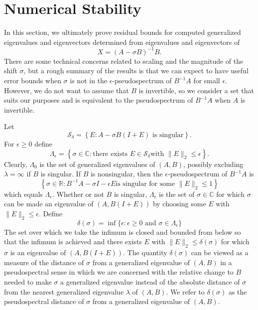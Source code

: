 \documentclass[12pt]{article}
\def\R{ {\mathbb R}}\def\C{ {\mathbb C}}\def\N{ {\mathbb N}}
\begin{document}
\section{Numerical Stability}
\label{sec:numerical-stability}

In this section, we ultimately prove residual bounds for computed
generalized eigenvalues and eigenvectors determined from eigenvalues
and eigenvectors of
\begin{equation}
  \label{eq:Xdef}
  X = (A-\sigma B)^{-1} B.
\end{equation}
There are some technical concerns related to scaling and the magnitude
of the shift $\sigma$, but a rough summary of the results is that we
can expect to have useful error bounds when $\sigma$ is not in the
$\epsilon$-pseudospectrum of $B^{-1}A$ for small $\epsilon$.  However,
we do not want to assume that $B$ is invertible, so we consider a set
that suits our purposes and is equivalent to the pseudospectrum of
$B^{-1}A$ when $A$ is invertible.

Let
\begin{equation}
  \label{eq:S_def}
  \mathcal{S}_\delta = 
  \left\{ E : \mbox{$A - \sigma B (I+E)$ is singular} \right\}.
\end{equation}
For $\epsilon \geq 0$ define
\begin{equation}
  \Lambda_\epsilon =
  \left\{ \sigma \in \C: \mbox{there exists $E\in \mathcal{S}_\delta$
      with $\|E\|_2\leq \epsilon$}
  \right\}.
\end{equation}
Clearly, $\Lambda_0$ is the set of generalized eigenvalues of $(A,B)$,
possibly excluding $\lambda = \infty$ if $B$ is singular.  If $B$ is
nonsingular, then the $\epsilon$-pseudospectrum of $B^{-1} A$ is
\begin{equation*}
  \left\{ \sigma \in \R: \mbox{$B^{-1}A-\sigma I - \epsilon E$
      is singular for some $\|E\|_2\leq 1$}\right\}
\end{equation*}
which equals $\Lambda_\epsilon$.  Whether or not $B$ is singular,
$\Lambda_\epsilon$ is the set of $\sigma\in \C$ for which $\sigma$ can
be made an eigenvalue of $(A, B(I+E))$ by choosing some $E$ with
$\|E\|_2\leq \epsilon$.  Define
\begin{equation}
  \label{eq:delta_def}
  \delta(\sigma) = \inf \{ \epsilon :
  \mbox{$\epsilon \geq 0$ and $\sigma \in \Lambda_\epsilon$}\}
\end{equation}
The set over which we take the infimum is closed and bounded from
below so that the infimum is achieved and there exists $E$ with
$\|E\|_2\leq \delta(\sigma)$ for which $\sigma$ is an eigenvalue of
$(A, B(I+E))$.  The quantity $\delta(\sigma)$ can be viewed as a
measure of the distance of $\sigma$ from a generalized eigenvalue of
$(A,B)$ in a pseudospectral sense in which we are concerned with the
relative change to $B$ needed to make $\sigma$ a generalized
eigenvalue instead of the absolute distance of $\sigma$ from the
nearest generalized eigenvalue $\lambda$ of $(A,B)$.  We refer to
$\delta(\sigma)$ as the pseudospectral distance of $\sigma$ from a
generalized eigenvalue of $(A,B)$.
\end{document}
